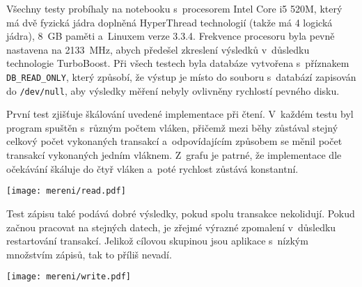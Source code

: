Všechny testy probíhaly na notebooku s~procesorem Intel Core i5 520M, který má
dvě fyzická jádra doplněná HyperThread technologií (takže má 4 logická jádra), 8~GB
paměti a~Linuxem verze 3.3.4. Frekvence procesoru byla pevně nastavena na 2133~MHz,
abych předešel zkreslení výsledků v~důsledku technologie TurboBoost.
Při všech testech byla databáze vytvořena s~příznakem \verb|DB_READ_ONLY|, který
způsobí, že výstup je místo do souboru s~databází zapisován do \verb|/dev/null|,
aby výsledky měření nebyly ovlivněny rychlostí pevného disku.

První test zjišťuje škálování uvedené implementace při čtení. V~každém testu byl
program spuštěn s~různým počtem vláken, přičemž mezi běhy zůstával stejný celkový
počet vykonaných transakcí a~odpovídajícím způsobem se měnil počet transakcí vykonaných
jedním vláknem. Z~grafu je patrné, že implementace dle očekávání škáluje do čtyř vláken
a~poté rychlost zůstává konstantní.

\centerline{\texttt{[image: mereni/read.pdf]}}

Test zápisu také podává dobré výsledky, pokud spolu transakce nekolidují. Pokud
začnou pracovat na stejných datech, je zřejmé výrazné zpomalení v~důsledku restartování
transakcí. Jelikož cílovou skupinou jsou aplikace s~nízkým množstvím zápisů,
tak to příliš nevadí.

\centerline{\texttt{[image: mereni/write.pdf]}}

